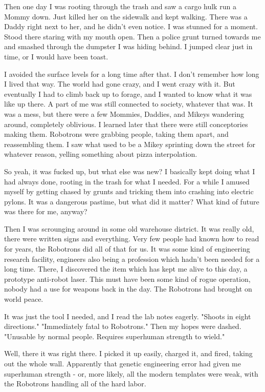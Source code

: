 \documentclass{amsbook}
\begin{document}
Then one day I was rooting through the trash and saw a cargo hulk run a Mommy down.  Just killed her on the sidewalk and kept walking.  There was a Daddy right next to her, and he didn't even notice.  I was stunned for a moment.  Stood there staring with my mouth open.  Then a police grunt turned towards me and smashed through the dumpster I was hiding behind.  I jumped clear just in time, or I would have been toast.

I avoided the surface levels for a long time after that.  I don't remember how long I lived that way.  The world had gone crazy, and I went crazy with it.  But eventually I had to climb back up to forage, and I wanted to know what it was like up there.  A part of me was still connected to society, whatever that was.  It was a mess, but there were a few Mommies, Daddies, and Mikeys wandering around, completely oblivious.  I learned later that there were still conceptories making them.  Robotrons were grabbing people, taking them apart, and reassembling them.  I saw what used to be a Mikey sprinting down the street for whatever reason, yelling something about pizza interpolation.

So yeah, it was fucked up, but what else was new?  I basically kept doing what I had always done, rooting in the trash for what I needed.  For a while I amused myself by getting chased by grunts and tricking them into crashing into electric pylons.  It was a dangerous pastime, but what did it matter?  What kind of future was there for me, anyway?

Then I was scrounging around in some old warehouse district.  It was really old, there were written signs and everything.  Very few people had known how to read for years, the Robotrons did all of that for us.  It was some kind of engineering research facility, engineers also being a profession which hadn't been needed for a long time.  There, I discovered the item which has kept me alive to this day, a prototype anti-robot laser.  This must have been some kind of rogue operation, nobody had a use for weapons back in the day.  The Robotrons had brought on world peace.

It was just the tool I needed, and I read the lab notes eagerly. "Shoots in eight directions." "Immediately fatal to Robotrons."  Then my hopes were dashed.  "Unusable by normal people.  Requires superhuman strength to wield."

Well, there it was right there.  I picked it up easily, charged it, and fired, taking out the whole wall.  Apparently that genetic engineering error had given me superhuman strength - or, more likely, all the modern templates were weak, with the Robotrons handling all of the hard labor.
\end{document}
